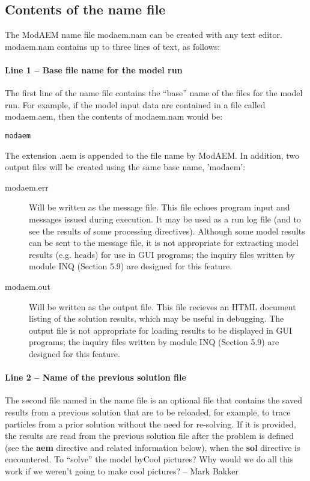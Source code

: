 \subsection{Contents of the name file }

The ModAEM name file \textsf{modaem.nam} can be created with any text
editor. \textsf{modaem.nam} contains up to three lines of text, as
follows:

\paragraph{Line 1 -- Base file name for the model run}

The first line of the name file contains the ``base'' name of the
files for the model run. For example, if the model input data are
contained in a file called \textsf{modaem.aem}, then the contents
of \textsf{modaem.nam} would be:
\begin{verbatim}
modaem
\end{verbatim}
The extension \textsf{.aem} is appended to the file name by ModAEM.
In addition, two output files will be created using the same base
name, '\textsf{modaem}':
\begin{description}
\item [{\textsf{\textmd{modaem.err}}}] Will be written as the message
file. This file echoes program input and messages issued during execution.
It may be used as a run log file (and to see the results of some processing
directives). Although some model results can be sent to the message
file, it is not appropriate for extracting model results (e.g. heads)
for use in GUI programs; the inquiry
files written by module INQ (Section 5.9) are designed for this feature.
\item [{\textsf{\textmd{modaem.out}}}] Will be written as the output
file. This file recieves an HTML document listing of the solution
results, which may be useful in debugging. The output file is not
appropriate for loading results to be displayed in GUI programs; the
inquiry files written by module INQ
(Section 5.9) are designed for this feature.
\end{description}

\paragraph{Line 2 -- Name of the previous solution file}

The second file named in the name file is an optional file that contains
the saved results from a previous solution that are to be reloaded,
for example, to trace particles from a prior solution without the
need for re-solving. If it is provided, the results are read from
the previous solution file after the problem is defined (see the \textsf{\textbf{aem}}
directive and related information below), when the \textsf{\textbf{sol}}
directive is encountered. To ``solve'' the model byCool pictures?
Why would we do all this work if we weren't going to make cool pictures?
-- Mark Bakker

